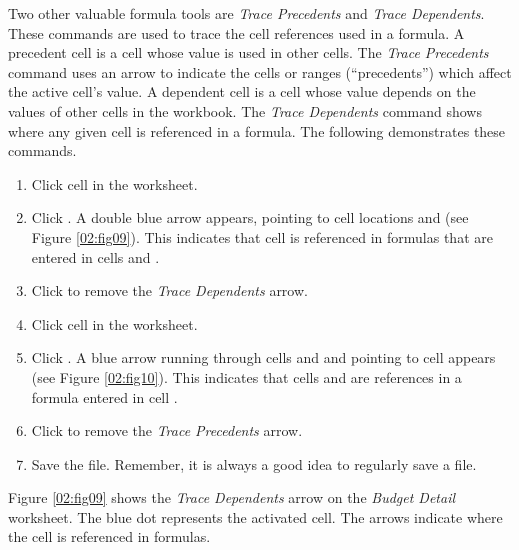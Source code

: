 Two other valuable formula tools are \textit{Trace Precedents} and \textit{Trace Dependents}. These commands are used to trace the cell references used in a formula. A precedent cell is a cell whose value is used in other cells. The \textit{Trace Precedents} command uses an arrow to indicate the cells or ranges (``precedents'') which affect the active cell's value. A dependent cell is a cell whose value depends on the values of other cells in the workbook. The \textit{Trace Dependents} command shows where any given cell is referenced in a formula. The following demonstrates these commands.

\begin{enumbox}
	\begin{enumerate}
		\item Click cell  in the  worksheet.
		\item Click . A double blue arrow appears, pointing to cell locations  and  (see Figure \ref{02:fig09}). This indicates that cell  is referenced in formulas that are entered in cells  and .
		\item Click  to remove the \textit{Trace Dependents} arrow.
		\item Click cell  in the  worksheet.
		\item Click . A blue arrow running through cells  and  and pointing to cell  appears (see Figure \ref{02:fig10}). This indicates that cells  and  are references in a formula entered in cell .
		\item Click  to remove the \textit{Trace Precedents} arrow.
		\item Save the  file. Remember, it is always a good idea to regularly save a file.
	\end{enumerate}
\end{enumbox}

Figure \ref{02:fig09} shows the \textit{Trace Dependents} arrow on the \textit{Budget Detail} worksheet. The blue dot represents the activated cell. The arrows indicate where the cell is referenced in formulas.

